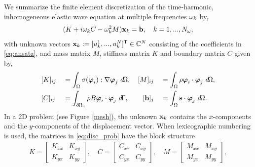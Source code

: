 We summarize the finite element discretization of the time-harmonic, inhomogeneous elastic wave equation at multiple frequencies ${\omega}_k$ by,
\begin{align}
\label{eq:disc_prob}
 (K + i \shift_k C - \shift_k^2 M) \x_k = \rhs, \quad k = 1,...,\Nom, %
\end{align}
with unknown vectors ${\mathbf{x}}_k := [u_k^1,...,u_k^N]^\mathsf{T} \in {\mathbb{C}}^N$ consisting of the coefficients in \eqref{eq:ansatz}, and mass matrix $M$, stiffness matrix $K$ and boundary matrix $C$ given by,
\begin{alignat*}{3}
 & [K]_{ij} &&= \int_\Omega \sigma(\boldsymbol\varphi_i) : \nabla \boldsymbol\varphi_j \ d \! \Omega, \quad 
 [M]_{ij} &&= \int_\Omega \rho \boldsymbol\varphi_i \cdot \boldsymbol\varphi_j \ d \! \Omega, \\
 & [C]_{ij} &&= \int_{\partial \! \Omega_a} \rho B \boldsymbol\varphi_i \cdot \boldsymbol\varphi_j \ d \! \Gamma, \quad \phantom{aa}
 [\mathbf{b}]_j &&= \int_\Omega \mathbf{s} \cdot \boldsymbol\varphi_j \ d \! \Omega.
\end{alignat*}
In a 2D problem (see Figure \ref{mesh}), the unknown ${\mathbf{x}}_k$ contains the $x$-components and the $y$-components of the displacement vector. When lexicographic numbering is used, the matrices in \eqref{eq:disc_prob} have the block structure
\begin{align*}
 K = \begin{bmatrix}
      K_{xx} & K_{xy} \\ K_{yx} & K_{yy}
     \end{bmatrix}, \quad
 C = \begin{bmatrix}
      C_{xx} & C_{xy} \\ C_{yx} & C_{yy}
     \end{bmatrix}, \quad
 M = \begin{bmatrix}
      M_{xx} & M_{xy} \\ M_{yx} & M_{yy}
     \end{bmatrix},
\end{align*}

